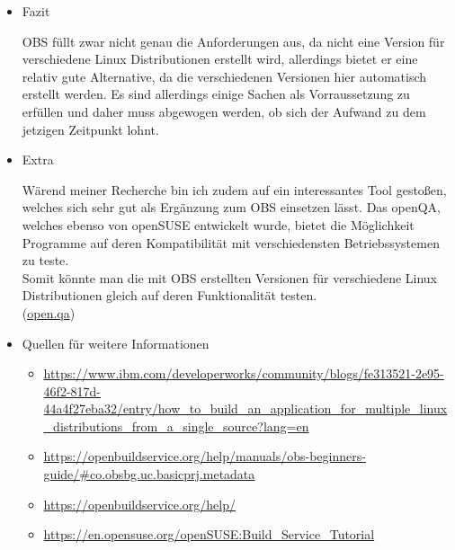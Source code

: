 \begin{itemize}
	\item Fazit
	
	OBS füllt zwar nicht genau die Anforderungen aus, da nicht eine Version für verschiedene Linux Distributionen erstellt wird, allerdings bietet er eine relativ gute Alternative, da die verschiedenen Versionen hier automatisch erstellt werden. Es sind allerdings einige Sachen als Vorraussetzung zu erfüllen und daher muss abgewogen werden, ob sich der Aufwand zu dem jetzigen Zeitpunkt lohnt.
	
	\item Extra
	
	Wärend meiner Recherche bin ich zudem auf ein interessantes Tool gestoßen, welches sich sehr gut als Ergänzung zum OBS einsetzen lässt.
	Das openQA, welches ebenso von openSUSE entwickelt wurde, bietet die Möglichkeit Programme auf deren Kompatibilität mit verschiedensten Betriebssystemen zu teste. \\
	Somit könnte man die mit OBS erstellten Versionen für verschiedene Linux Distributionen gleich auf deren Funktionalität testen. \\ (\url{open.qa})
	
	\item Quellen für weitere Informationen
	\begin{itemize}
		\item \url{https://www.ibm.com/developerworks/community/blogs/fe313521-2e95-46f2-817d-44a4f27eba32/entry/how_to_build_an_application_for_multiple_linux_distributions_from_a_single_source?lang=en}
		\item \url{https://openbuildservice.org/help/manuals/obs-beginners-guide/#co.obsbg.uc.basicprj.metadata}
		\item \url{https://openbuildservice.org/help/}
		\item \url{https://en.opensuse.org/openSUSE:Build_Service_Tutorial}
	\end{itemize}
	
	
	\end{itemize}

\nsecend


